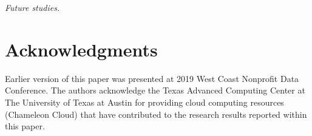 \documentclass[11pt]{article}
\begin{document}
\textit{Future studies.} 


\section*{Acknowledgments}

Earlier version of this paper was presented at 2019 West Coast Nonprofit Data Conference. The authors acknowledge the Texas Advanced Computing Center at The University of Texas at Austin for providing cloud computing resources (Chameleon Cloud) that have contributed to the research results reported within this paper.







\sloppy
\printbibliography
\end{document}
